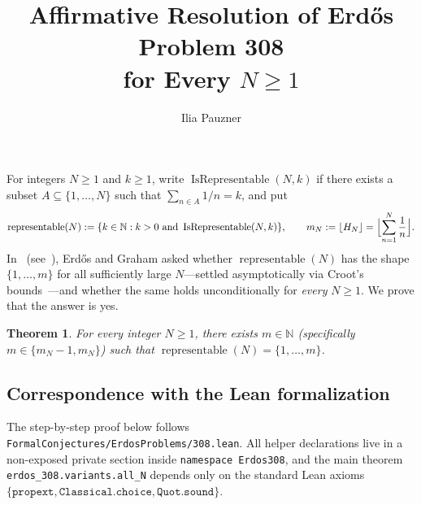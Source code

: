 \documentclass[11pt,a4paper]{amsart}
\title[Resolution of Erd\H{o}s Problem 308 (All-$N$ Variant)]{\texorpdfstring{Affirmative Resolution of Erd\H{o}s Problem 308\\ for Every $N \ge 1$}{Affirmative Resolution of Erdos Problem 308 for Every N >= 1}}
\author{Ilia Pauzner}
\date{}
\newtheorem*{theorem}{Theorem}
\theoremstyle{remark}
\newcommand{\Rep}{\operatorname{IsRepresentable}}
\newcommand{\repSet}{\operatorname{representable}}
\begin{document}
\maketitle

For integers $N \ge 1$ and $k \ge 1$, write $\Rep(N, k)$ if there exists a subset $A \subseteq \{1, \dots, N\}$ such that $\sum_{n \in A} 1 / n = k$, and put
\[
\repSet(N) := \{k \in \mathbb{N} : k > 0 \text{ and } \Rep(N, k)\},
\qquad
m_N := \lfloor H_N \rfloor = \Bigl\lfloor \sum_{n=1}^N \frac{1}{n} \Bigr\rfloor.
\]
In~\cite[p.~37]{ErGr80} (see~\cite{Cr99, EP308, FC308}), Erd\H{o}s and Graham asked whether $\repSet(N)$ has the shape $\{1, \dots, m\}$ for all sufficiently large $N$---settled asymptotically via Croot's bounds~\cite{Cr99}---and whether the same holds unconditionally for \emph{every} $N \ge 1$. We prove that the answer is yes.

\begin{theorem}
For every integer $N \ge 1$, there exists $m \in \mathbb{N}$ (specifically $m \in \{m_N - 1, m_N\}$) such that $\repSet(N) = \{1, \dots, m\}$.
\end{theorem}

\subsection*{Correspondence with the Lean formalization}
The step-by-step proof below follows \texttt{FormalConjectures/ErdosProblems/308.lean}. All helper declarations live in a non-exposed private section inside \texttt{namespace Erdos308}, and the main theorem \texttt{erdos\_308.variants.all\_N} depends only on the standard Lean axioms $\{\texttt{propext}, \texttt{Classical.choice}, \texttt{Quot.sound}\}$.
\end{document}
